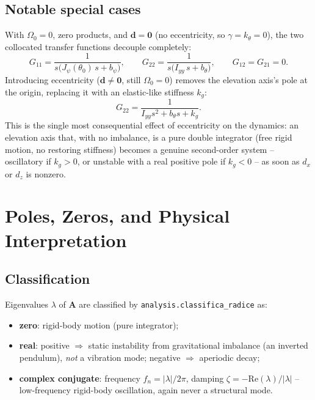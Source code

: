 \documentclass[11pt,a4paper]{article}
\numberwithin{equation}{section}
\newcommand{\bs}[1]{\boldsymbol{#1}}
\begin{document}
\subsection{Notable special cases}

With $\Omega_0=0$, zero products, and $\bs d=\bs 0$ (no eccentricity, so $\gamma=k_\theta=0$), the two collocated transfer functions decouple completely:
\begin{equation}
G_{11} = \frac{1}{s\big(J_\psi(\theta_0)\,s+b_\psi\big)},
\qquad
G_{22} = \frac{1}{s\big(I_{yy}\,s+b_\theta\big)},
\qquad
G_{12}=G_{21}=0 .
\label{eq:G-caso-base}
\end{equation}
Introducing eccentricity ($\bs d\ne\bs 0$, still $\Omega_0=0$) removes the elevation axis's pole at the origin, replacing it with an elastic-like stiffness $k_g$:
\begin{equation}
G_{22} = \frac{1}{I_{yy}s^2 + b_\theta s + k_g} .
\label{eq:G22-ecc}
\end{equation}
This is the single most consequential effect of eccentricity on the dynamics: an elevation axis that, with no imbalance, is a pure double integrator (free rigid motion, no restoring stiffness) becomes a genuine second-order system -- oscillatory if $k_g>0$, or unstable with a real positive pole if $k_g<0$ -- as soon as $d_x$ or $d_z$ is nonzero.

\section{Poles, Zeros, and Physical Interpretation}
\label{sec:poli-zeri}

\subsection{Classification}

Eigenvalues $\lambda$ of $\bs A$ are classified by \texttt{analysis.\allowbreak classifica\_\allowbreak radice} as:
\begin{itemize}
\item \textbf{zero}: rigid-body motion (pure integrator);
\item \textbf{real}: positive $\Rightarrow$ static instability from gravitational imbalance (an inverted pendulum), \emph{not} a vibration mode; negative $\Rightarrow$ aperiodic decay;
\item \textbf{complex conjugate}: frequency $f_n=|\lambda|/2\pi$, damping $\zeta=-\mathrm{Re}(\lambda)/|\lambda|$ -- low-frequency rigid-body oscillation, again never a structural mode.
\end{itemize}
\end{document}
